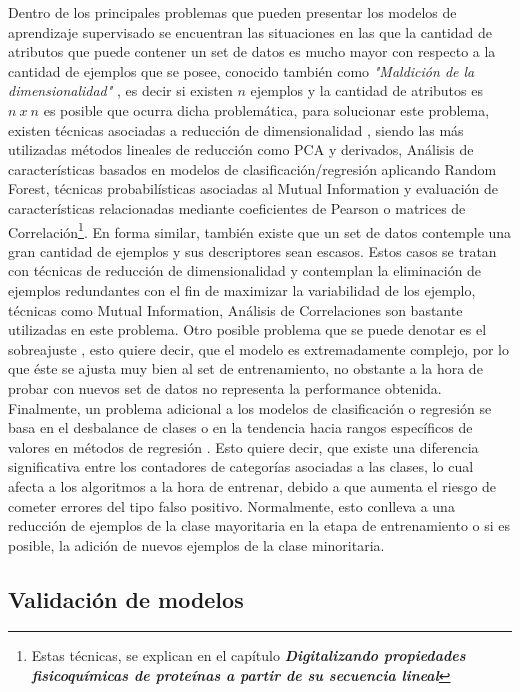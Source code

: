 Dentro de los principales problemas que pueden presentar los modelos de aprendizaje supervisado se encuentran las situaciones en las que la cantidad de atributos que puede contener un set de datos es mucho mayor con respecto a la cantidad de ejemplos que se posee, conocido también como \textit{"Maldición de la dimensionalidad"} \cite{indyk1998approximate}, es decir si existen $n$ ejemplos y la cantidad de atributos es $n\ x\ n$ es posible que ocurra dicha problemática, para solucionar este problema, existen técnicas asociadas a reducción de dimensionalidad \cite{sarwar2000application, van2009dimensionality}, siendo las más utilizadas métodos lineales de reducción como PCA y derivados, Análisis de características basados en modelos de clasificación/regresión aplicando Random Forest, técnicas probabilísticas asociadas al Mutual Information y evaluación de características relacionadas mediante coeficientes de Pearson o matrices de Correlación\footnote{Estas técnicas, se explican en el capítulo \textit{\textbf{Digitalizando propiedades fisicoquímicas de proteínas a partir de su secuencia lineal}}}. En forma similar, también existe que un set de datos contemple una gran cantidad de ejemplos y sus descriptores sean escasos. Estos casos se tratan con técnicas de reducción de dimensionalidad y contemplan la eliminación de ejemplos redundantes con el fin de maximizar la variabilidad de los ejemplo, técnicas como Mutual Information, Análisis de Correlaciones son bastante utilizadas en este problema. Otro posible problema que se puede denotar es el sobreajuste \cite{hawkins2004problem}, esto quiere decir, que el modelo es extremadamente complejo, por lo que éste se ajusta muy bien al set de entrenamiento, no obstante a la hora de probar con nuevos set de datos no representa la performance obtenida. Finalmente, un problema adicional a los modelos de clasificación o regresión se basa en el desbalance de clases o en la tendencia hacia rangos específicos de valores en métodos de regresión \cite{japkowicz2002class}. Esto quiere decir, que existe una diferencia significativa entre los contadores de categorías asociadas a las clases, lo cual afecta a los algoritmos a la hora de entrenar, debido a que aumenta el riesgo de cometer errores del tipo falso positivo. Normalmente, esto conlleva a una reducción de ejemplos de la clase mayoritaria en la etapa de entrenamiento o si es posible, la adición de nuevos ejemplos de la clase minoritaria. 


\subsection{Validación de modelos}

